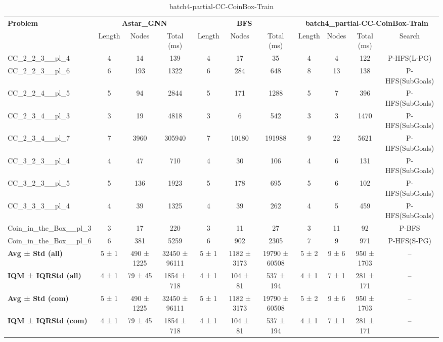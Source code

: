 \begin{table}[!ht]
\centering
\scriptsize
\begin{tabular}{l|ccc|ccc|cccc}
\multirow{2}{*}{\textbf{Problem}} & \multicolumn{3}{c|}{\textbf{Astar\_GNN}} & \multicolumn{3}{c|}{\textbf{BFS}} & \multicolumn{4}{c}{\textbf{batch4\_partial-CC-CoinBox-Train}} \\
\cline{2-11}
& Length & Nodes & Total (ms) & Length & Nodes & Total (ms) & Length & Nodes & Total (ms) & Search \\
\hline
CC\_2\_2\_3\_\_pl\_4 & 4 & 14 & 139 & 4 & 17 & 35 & 4 & 4 & 122 & P-HFS(L-PG) \\
CC\_2\_2\_3\_\_pl\_6 & 6 & 193 & 1322 & 6 & 284 & 648 & 8 & 13 & 138 & P-HFS(SubGoals) \\
CC\_2\_2\_4\_\_pl\_5 & 5 & 94 & 2844 & 5 & 171 & 1288 & 5 & 7 & 396 & P-HFS(SubGoals) \\
CC\_2\_3\_4\_\_pl\_3 & 3 & 19 & 4818 & 3 & 6 & 542 & 3 & 3 & 1470 & P-HFS(SubGoals) \\
CC\_2\_3\_4\_\_pl\_7 & 7 & 3960 & 305940 & 7 & 10180 & 191988 & 9 & 22 & 5621 & P-HFS(SubGoals) \\
CC\_3\_2\_3\_\_pl\_4 & 4 & 47 & 710 & 4 & 30 & 106 & 4 & 6 & 131 & P-HFS(SubGoals) \\
CC\_3\_2\_3\_\_pl\_5 & 5 & 136 & 1923 & 5 & 178 & 695 & 5 & 6 & 102 & P-HFS(SubGoals) \\
CC\_3\_3\_3\_\_pl\_4 & 4 & 39 & 1325 & 4 & 39 & 262 & 4 & 5 & 459 & P-HFS(SubGoals) \\
Coin\_in\_the\_Box\_\_pl\_3 & 3 & 17 & 220 & 3 & 11 & 27 & 3 & 11 & 92 & P-BFS \\
Coin\_in\_the\_Box\_\_pl\_6 & 6 & 381 & 5259 & 6 & 902 & 2305 & 7 & 9 & 971 & P-HFS(S-PG) \\
\hline
\textbf{Avg ± Std (all)} & 5 ± 1 & 490 ± 1225 & 32450 ± 96111 & 5 ± 1 & 1182 ± 3173 & 19790 ± 60508 & 5 ± 2 & 9 ± 6 & 950 ± 1703 & -- \\
\textbf{IQM ± IQRStd (all)} & 4 ± 1 & 79 ± 45 & 1854 ± 718 & 4 ± 1 & 104 ± 81 & 537 ± 194 & 4 ± 1 & 7 ± 1 & 281 ± 171 & -- \\
\textbf{Avg ± Std (com)} & 5 ± 1 & 490 ± 1225 & 32450 ± 96111 & 5 ± 1 & 1182 ± 3173 & 19790 ± 60508 & 5 ± 2 & 9 ± 6 & 950 ± 1703 & -- \\
\textbf{IQM ± IQRStd (com)} & 4 ± 1 & 79 ± 45 & 1854 ± 718 & 4 ± 1 & 104 ± 81 & 537 ± 194 & 4 ± 1 & 7 ± 1 & 281 ± 171 & -- \\
\end{tabular}
\caption{batch4-partial-CC-CoinBox-Train}
\label{tab:batch4_partial_CC-CoinBox_comparison_train}
\end{table}
